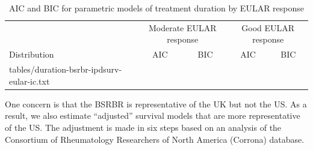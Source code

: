 \documentclass[11pt,final,fleqn]{article}\usepackage[]{graphicx}\usepackage[]{color}
\makeatletter
\theoremstyle{plain}
\newcommand*\ExpandableInput[1]{\@@input#1 }
\makeatother
\begin{document}
\begin{table}[!ht]
\begin{center}
\begin{threeparttable}
\caption{AIC and BIC for parametric models of treatment duration by EULAR response} \label{tbl:ic-dur-eular}
\begin{tabularx}{\textwidth}{@{\extracolsep{\fill}}lcccc}
\hline
\multicolumn{1}{l}{} & \multicolumn{2}{c}{Moderate EULAR response} & \multicolumn{2}{c}{Good EULAR response} \\
\cmidrule{2-3} \cmidrule{4-5}
\multicolumn{1}{l}{Distribution} & \multicolumn{1}{c}{AIC} & \multicolumn{1}{c}{BIC} & \multicolumn{1}{c}{AIC}  & \multicolumn{1}{c}{BIC}   \\
\hline
\ExpandableInput{tables/duration-bsrbr-ipdsurv-eular-ic.txt}
\hline
\end{tabularx}
\end{threeparttable}
\end{center}
\end{table}

One concern is that the BSRBR is representative of the UK but not the
US. As a result, we also estimate ``adjusted'' survival models that are
more representative of the US. The adjustment is made in six steps based
on an analysis of the Consortium of Rheumatology Researchers of North
America (Corrona) database.
\end{document}
